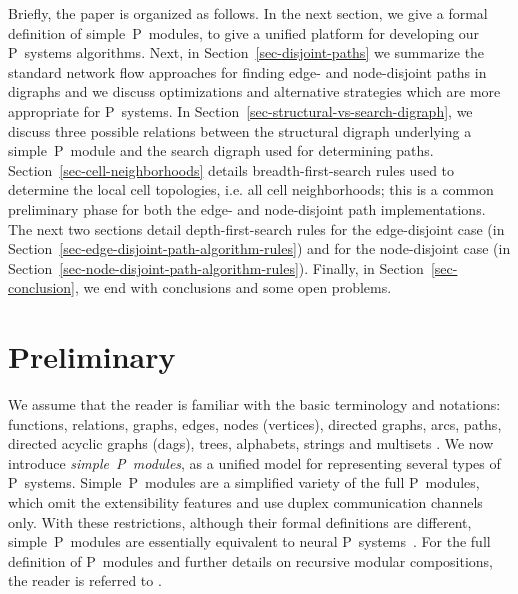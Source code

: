 \documentclass[preliminary,copyright,creativecommons]{eptcs}
\theoremstyle{remark}
\begin{document}
Briefly, the paper is organized as follows. In the next section, 
we give a formal definition of simple~P~modules, 
to give a unified platform for developing our P~systems algorithms.  
Next, in Section~\ref{sec-disjoint-paths} we summarize the standard network flow
approaches for finding edge- and node-disjoint paths in digraphs and 
we discuss optimizations and alternative strategies which are more appropriate for P~systems.
In Section~\ref{sec-structural-vs-search-digraph}, we discuss three possible
relations between the structural digraph underlying a simple~P~module
and the search digraph used for determining paths.
Section~\ref{sec-cell-neighborhoods} details breadth-first-search rules used 
to determine the local cell topologies,
i.e. all cell neighborhoods; this is a common preliminary phase for 
both the edge- and node-disjoint path implementations.
The next two sections detail depth-first-search rules
for the edge-disjoint case (in Section~\ref{sec-edge-disjoint-path-algorithm-rules})
and for the node-disjoint case (in Section~\ref{sec-node-disjoint-path-algorithm-rules}).
Finally, in Section~\ref{sec-conclusion}, 
we end with conclusions and some open problems.


\section{Preliminary}
\label{sec-preliminary}

We assume that the reader is familiar with the basic terminology 
and notations: functions, relations, graphs, edges, nodes (vertices), 
directed graphs, arcs, paths, directed acyclic graphs (dags), 
trees, alphabets, strings and multisets
\cite{NDK-IJCCC2010}.  We now introduce \emph{simple~P~modules},
as a unified model for representing several types of P~systems. 
Simple~P~modules are a simplified variety of the 
full P~modules, which omit the extensibility features
and use duplex communication channels only. 
With these restrictions, although their formal definitions are different,
simple~P~modules are essentially equivalent to neural P~systems~\cite{MartinVidePPR2003}. 
For the full definition of P~modules and
further details on recursive modular compositions,
the reader is referred to \cite{DKN-JLAP2010}.
\end{document}

